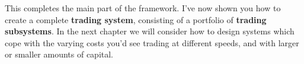 This completes the main part of the framework. I've now shown you how to create a complete \textbf{trading system}, consisting of a portfolio of \textbf{trading subsystems}. In the next chapter we will consider how to design systems which cope with the varying costs you'd see trading at different speeds, and with larger or smaller amounts of capital.
